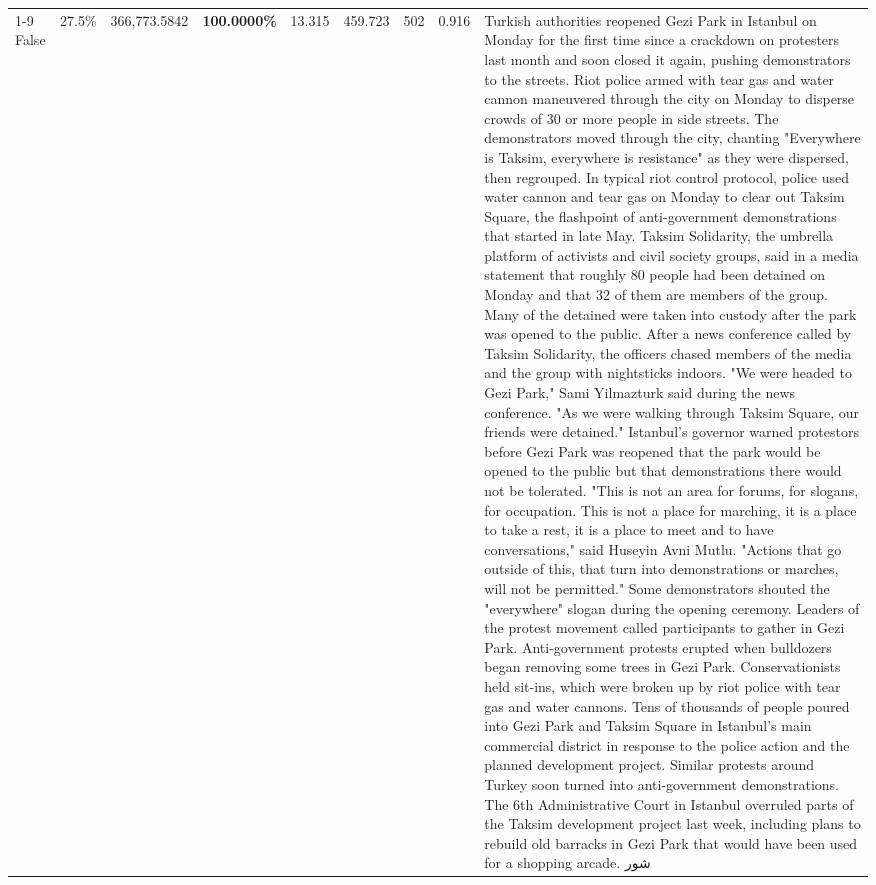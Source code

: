 \begin{table}[H]
\begin{tabular}{lllrlllll}
\cline{1-9}
False & 27.5\% & 366,773.5842 & \bfseries \color{red} 100.0000\% & 13.315 & 459.723 & 502 & 0.916 & Turkish authorities reopened Gezi Park in Istanbul on Monday for the first time since a crackdown on protesters last month and soon closed it again, pushing demonstrators to the streets. Riot police armed with tear gas and water cannon maneuvered through the city on Monday to disperse crowds of 30 or more people in side streets. The demonstrators moved through the city, chanting "Everywhere is Taksim, everywhere is resistance" as they were dispersed, then regrouped. In typical riot control protocol, police used water cannon and tear gas on Monday to clear out Taksim Square, the flashpoint of anti-government demonstrations that started in late May. Taksim Solidarity, the umbrella platform of activists and civil society groups, said in a media statement that roughly 80 people had been detained on Monday and that 32 of them are members of the group. Many of the detained were taken into custody after the park was opened to the public. After a news conference called by Taksim Solidarity, the officers chased members of the media and the group with nightsticks indoors. "We were headed to Gezi Park," Sami Yilmazturk said during the news conference. "As we were walking through Taksim Square, our friends were detained." Istanbul's governor warned protestors before Gezi Park was reopened that the park would be opened to the public but that demonstrations there would not be tolerated. "This is not an area for forums, for slogans, for occupation. This is not a place for marching, it is a place to take a rest, it is a place to meet and to have conversations," said Huseyin Avni Mutlu. "Actions that go outside of this, that turn into demonstrations or marches, will not be permitted." Some demonstrators shouted the "everywhere" slogan during the opening ceremony. Leaders of the protest movement called participants to gather in Gezi Park. Anti-government protests erupted when bulldozers began removing some trees in Gezi Park. Conservationists held sit-ins, which were broken up by riot police with tear gas and water cannons. Tens of thousands of people poured into Gezi Park and Taksim Square in Istanbul's main commercial district in response to the police action and the planned development project. Similar protests around Turkey soon turned into anti-government demonstrations. The 6th Administrative Court in Istanbul overruled parts of the Taksim development project last week, including plans to rebuild old barracks in Gezi Park that would have been used for a shopping arcade. شور \\

\end{tabular}
\end{table}
